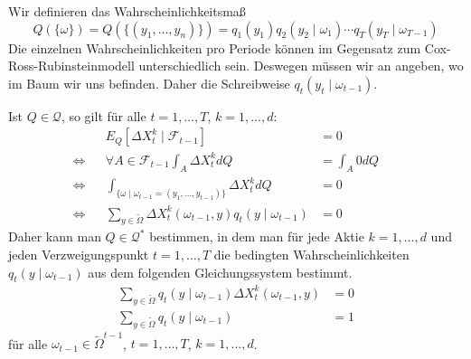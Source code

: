\documentclass[a4paper,twoside,DIV15,BCOR12mm]{scrbook}
\newcommand{\cF}{\mathcal F}
\newcommand{\cQ}{\mathcal Q}
\begin{document}
Wir definieren das Wahrscheinlichkeitsmaß 
\[
Q(\{\omega\}) = Q(\{(y_1,\ldots,y_n)\}) = q_1(y_1) q_2(y_2\mid \omega_1) \cdots q_T(y_T\mid \omega_{T-1})
\]
Die einzelnen Wahrscheinlichkeiten pro Periode können im Gegensatz zum Cox-Ross-Rubinsteinmodell unterschiedlich sein. Deswegen müssen wir an angeben, wo im Baum wir uns befinden. Daher die Schreibweise $q_t(y_t\mid \omega_{t-1})$. 

Ist $Q\in\cQ$, so gilt für alle $t=1,\ldots,T$, $k=1,\ldots,d$:
\begin{align*}
&& E_Q[\Delta X_t^k\mid \cF_{t-1}] &= 0 \\
\iff && \forall A \in \cF_{t-1} \int_A \Delta X_t^kdQ &= \int_A 0 dQ  && \\
\iff && \int_{\{\omega \mid \omega_{t-1} = (y_1,\ldots,y_{t-1})\}}
\Delta X_t^k dQ &= 0\\
\iff && \sum_{y\in\tilde\Omega} \Delta X_t^k(\omega_{t-1}, y) q_t(y\mid \omega_{t-1}) &= 0
\end{align*}
Daher kann man $Q\in \cQ^*$ bestimmen, in dem man für jede Aktie $k=1,\ldots,d$ und jeden Verzweigungspunkt $t=1,\ldots,T$ die bedingten Wahrscheinlichkeiten $q_t(y\mid \omega_{t-1})$ aus dem folgenden Gleichungssystem bestimmt.
\begin{align*}
\sum_{y\in\tilde\Omega} q_t(y\mid \omega_{t-1}) \Delta X_t^k (\omega_{t-1},y) &= 0 \\
\sum_{y\in\tilde\Omega} q_t(y \mid \omega_{t-1}) &= 1
\end{align*}
für alle $\omega_{t-1}\in \tilde\Omega^{t-1}$, $t=1,\ldots,T$, $k=1,\ldots,d$.
\end{document}
